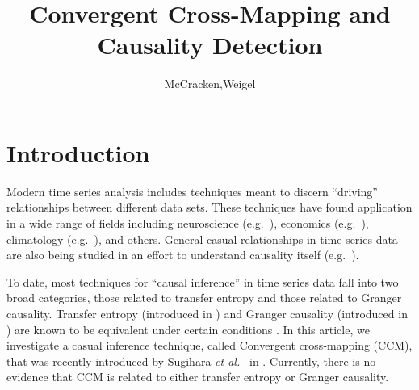 \documentclass[a4paper,11pt,twocolumn]{article}
\title{Convergent Cross-Mapping and Causality Detection}
\author{McCracken,Weigel}
\begin{document}
\maketitle


\section{Introduction}
Modern time series analysis includes techniques meant to discern ``driving'' relationships between different data sets.  These techniques have found application in a wide range of fields including neuroscience (e.g.\ \cite{Kaminski2001}), economics (e.g.\ \cite{dufour1998,dufour2006}), climatology (e.g.\ \cite{mosedale2006}), and others.  General casual relationships in time series data are also being studied in an effort to understand causality itself (e.g.\ \cite{eichler2012}).  

To date, most techniques for ``causal inference'' in time series data fall into two broad categories, those related to transfer entropy and those related to Granger causality.  Transfer entropy (introduced in \cite{Schreiber2000}) and Granger causality (introduced in \cite{granger1969}) are known to be equivalent under certain conditions \cite{Barnett2009}.  In this article, we investigate a casual inference technique, called Convergent cross-mapping (CCM), that was recently introduced by Sugihara {\em et al.\ } in \cite{Sugihara2012}.  Currently, there is no evidence that CCM is related to either transfer entropy or Granger causality.
\end{document}
